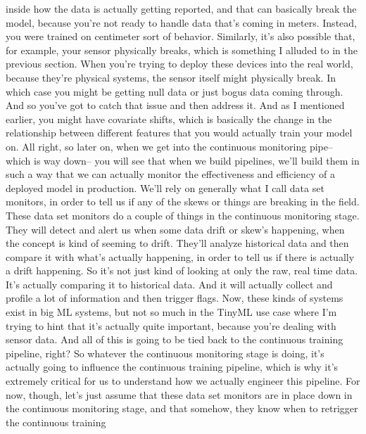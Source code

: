 {{{{    inside how the data is actually getting reported,
    and that can basically break the model, because you're not
    ready to handle data that's coming in meters.
    Instead, you were trained on centimeter sort of behavior.
    Similarly, it's also possible that, for example, your sensor physically
    breaks, which is something I alluded to in the previous section.
    When you're trying to deploy these devices into the real world,
    because they're physical systems, the sensor itself might physically break.
    In which case you might be getting null data or just bogus data coming through.
    And so you've got to catch that issue and then address it.
    And as I mentioned earlier, you might have covariate shifts,
    which is basically the change in the relationship between different features
    that you would actually train your model on.
    All right, so later on, when we get into the continuous monitoring pipe--
    which is way down--
    you will see that when we build pipelines,
    we'll build them in such a way that we can actually
    monitor the effectiveness and efficiency of a deployed model in production.
    We'll rely on generally what I call data set monitors,
    in order to tell us if any of the skews or things are breaking in the field.
    These data set monitors do a couple of things in the continuous monitoring
    stage.
    They will detect and alert us when some data drift
    or skew's happening, when the concept is kind of seeming to drift.
    They'll analyze historical data and then compare it
    with what's actually happening, in order to tell us
    if there is actually a drift happening.
    So it's not just kind of looking at only the raw, real time data.
    It's actually comparing it to historical data.
    And it will actually collect and profile a lot of information
    and then trigger flags.
    Now, these kinds of systems exist in big ML systems,
    but not so much in the TinyML use case where
    I'm trying to hint that it's actually quite important,
    because you're dealing with sensor data.
    And all of this is going to be tied back to the continuous training pipeline,
    right?
    So whatever the continuous monitoring stage is doing,
    it's actually going to influence the continuous training pipeline, which
    is why it's extremely critical for us to understand how we actually
    engineer this pipeline.
    For now, though, let's just assume that these data
    set monitors are in place down in the continuous monitoring stage,
    and that somehow, they know when to retrigger the continuous training
}}}}
